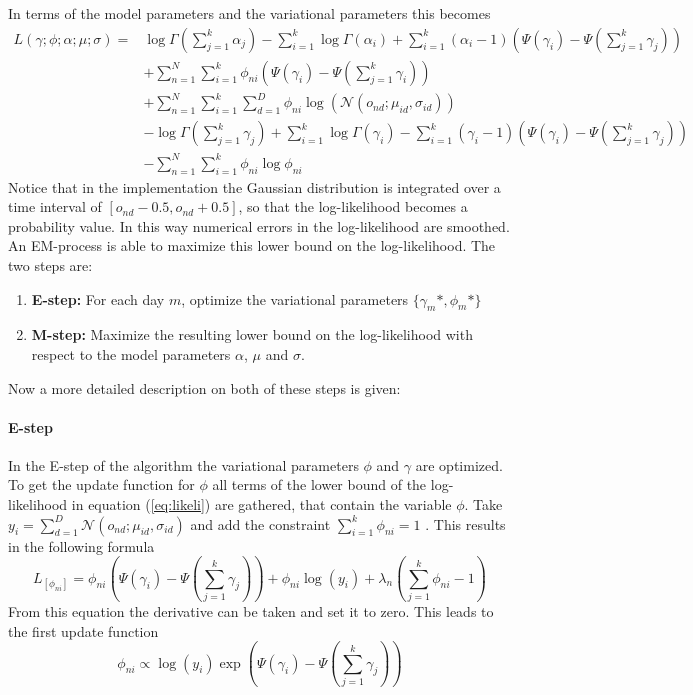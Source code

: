 In terms of the model parameters and the variational parameters this becomes
\begin{equation}
  \begin{split}
 L(\gamma;\phi;\alpha;\mu;\sigma) =& \log \Gamma (\sum_{j=1}^k \alpha_j) - \sum_{i=1}^k \log \Gamma(\alpha_i) + \sum_{i=1}^k (\alpha_i-1)(\Psi(\gamma_i)-\Psi(\sum_{j=1}^k \gamma_j)) \\
 & + \sum_{n=1}^N \sum_{i=1}^k \phi_{ni} (\Psi(\gamma_i)-\Psi(\sum_{j=1}^k \gamma_i)) \\
  & + \sum_{n=1}^N \sum_{i=1}^k \sum_{d=1}^D \phi_{ni} \log( \mathcal{N}(o_{nd};\mu_{id},\sigma_{id})) \\
  & - \log \Gamma (\sum_{j=1}^k \gamma_j) + \sum_{i=1}^k \log \Gamma (\gamma_i) - \sum_{i=1}^k (\gamma_i -1)(\Psi(\gamma_i)-\Psi(\sum_{j=1}^k \gamma_j)) \\
 & - \sum_{n=1}^N \sum_{i=1}^k \phi_{ni} \log \phi_{ni}
  \end{split}
  \label{eq:likeli}
\end{equation}
Notice that in the implementation the Gaussian distribution is integrated over a time interval of $[{o_{nd}-0.5},{o_{nd}+0.5}]$, so that the log-likelihood becomes a probability value. In this way numerical errors in the log-likelihood are smoothed.\\

An EM-process is able to maximize this lower bound on the log-likelihood. The two steps are:
  \begin{enumerate}
   \item \textbf{E-step:} For each day $m$, optimize the variational parameters $\{ \gamma_{m}*,\phi_{m}* \}$
   \item \textbf{M-step:} Maximize the resulting lower bound on the log-likelihood with respect to the model parameters $\alpha$, $\mu$ and $\sigma$.
  \end{enumerate}
  
  Now a more detailed description on both of these steps is given:
  
  \paragraph{E-step}
In the E-step of the algorithm the variational parameters $\phi$ and $\gamma$ are optimized. To get the update function for $\phi$ all terms of the lower bound of the log-likelihood in equation (\ref{eq:likeli}) are gathered, that contain the variable $\phi$. 
Take $y_i=\sum_{d=1}^D \mathcal{N}(o_{nd};\mu_{id},\sigma_{id})$ and add the constraint $\sum_{i=1}^k \phi_{ni}=1 $ . This results in the following formula
\begin{equation}
 L_{[\phi_{ni}]} = \phi_{ni}(\Psi(\gamma_i)-\Psi(\sum_{j=1}^k \gamma_j)) + \phi_{ni} \log(y_i) + \lambda_n(\sum_{j=1}^k \phi_{ni} -1)
\end{equation}
From this equation the derivative can be taken and set it to zero. This leads to the first update function
\begin{equation}
 \phi_{ni} \propto \log(y_i) \exp(\Psi(\gamma_i) - \Psi(\sum_{j=1}^k \gamma_j))
\end{equation}
\\

